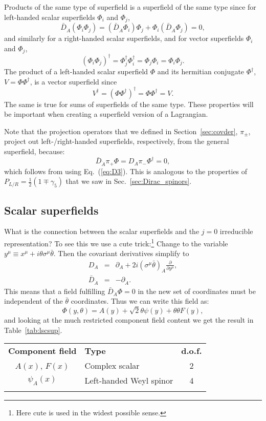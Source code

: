 \documentclass[notes.tex]{subfiles}
\begin{document}
Products of the same type of superfield is a superfield of the same type since for left-handed scalar superfields $\Phi_i$ and $\Phi_j$,
\[ \bar{D}_{\dot{A}}(\Phi_i\Phi_j) = (\bar{D}_{\dot{A}}\Phi_i)\Phi_j +\Phi_i( \bar{D}_{\dot{A}}\Phi_j)=0,\]
and similarly for a right-handed scalar superfields, and for vector superfields $\Phi_i$ and $\Phi_j$,
\[(\Phi_i\Phi_j)^\dagger=\Phi_j^\dagger \Phi_i^\dagger=\Phi_j \Phi_i= \Phi_i\Phi_j.\]
The product of a left-handed scalar superfield $\Phi$ and its hermitian conjugate $\Phi^\dagger$, $V=\Phi \Phi^\dagger$, is a vector superfield since
\[V^\dagger=(\Phi \Phi^\dagger)^\dagger=\Phi \Phi^\dagger=V.\]
The same is true for sums of superfields of the same type. These properties will be important when creating a superfield version of a Lagrangian.

Note that the projection operators that we defined in Section~\ref{sec:covder}, $\pi_\pm$, project out left-/right-handed superfields, respectively,  from the general superfield, because:
\[\bar{D}_{\dot{A}}\pi_+\Phi = D_A \pi_- \Phi^\dagger = 0, \]
which follows from using Eq.~(\ref{eq:D3}). This is analogous to the properties of $P_{L/R} = \frac{1}{2}(1\mp \gamma_5)$ that we saw in Sec.~\ref{sec:Dirac_spinors}.

\subsection{Scalar superfields}
What is the connection between the scalar superfields and the $j=0$ irreducible representation? To see this we use a cute trick:\footnote{Here cute is used in the widest possible sense.} Change to the variable $y^\mu \equiv x^\mu + i\theta\sigma^\mu \bar{\theta}$. Then the covariant derivatives simplify to
\begin{eqnarray}
D_A &=& \partial_A + 2i(\sigma^\mu\bar{\theta})_{A}\frac{\partial}{\partial y^\mu},\\
\bar{D}_{\dot{A}} &=& -\partial_{\dot{A}}.
\end{eqnarray}
This means that a field fulfilling $\bar{D}_{\dot{A}} \Phi = 0$ in the new set of coordinates must be independent of the $\bar{\theta}$ coordinates. Thus we can write this field as:
\begin{equation}
\Phi(y, \theta) = A(y) + \sqrt{2}\theta\psi(y) + \theta\theta F(y),
\label{eq:leftscalarsuperfield_y}
\end{equation}
and looking at the much restricted component field content we get the result in Table~\ref{tab:lscsup}.
\begin{center}
   \begin{tabular}{c |l| c} 
   \noalign{\smallskip}\hline\noalign{\smallskip}
   {\bf Component field} & {\bf Type} & {\bf d.o.f.} \\
   \noalign{\smallskip}\hline\noalign{\smallskip}
   $A(x)$, $F(x)$ & Complex scalar & 2\\
   $\psi_A(x)$ & Left-handed Weyl spinor & 4\\
   \noalign{\smallskip}\hline\noalign{\smallskip}
    \end{tabular}
   \end{center}
\end{document}
